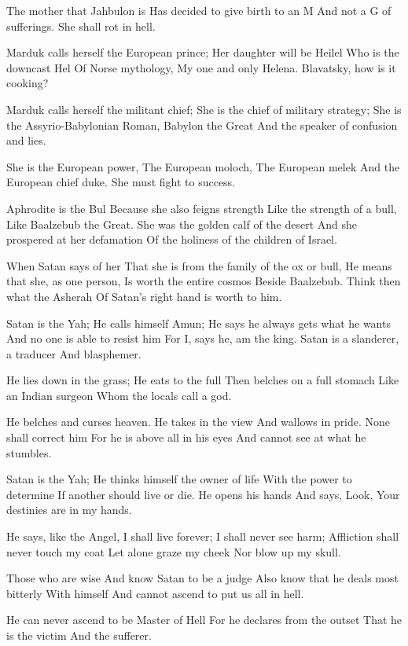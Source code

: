 \documentclass[
]{book}
\begin{document}
The mother that Jahbulon is
Has decided to give birth to an M
And not a G of sufferings.
She shall rot in hell.

Marduk calls herself the European prince;
Her daughter will be Heilel
Who is the downcast Hel
Of Norse mythology,
My one and only Helena.
Blavatsky, how is it cooking?

Marduk calls herself the militant chief;
She is the chief of military strategy;
She is the Assyrio-Babylonian Roman,
Babylon the Great
And the speaker of confusion and lies.

She is the European power,
The European moloch,
The European melek
And the European chief duke.
She must fight to success.

Aphrodite is the Bul
Because she also feigns strength
Like the strength of a bull,
Like Baalzebub the Great.
She was the golden calf of the desert
And she prospered at her defamation
Of the holiness of the children of Israel.

When Satan says of her
That she is from the family of the ox or bull,
He means that she, as one person,
Is worth the entire cosmos
Beside Baalzebub.
Think then what the Asherah
Of Satan's right hand is worth to him.

Satan is the Yah;
He calls himself Amun;
He says he always gets what he wants
And no one is able to resist him
For I, says he, am the king.
Satan is a slanderer, a traducer
And blasphemer.

He lies down in the grass;
He eats to the full
Then belches on a full stomach
Like an Indian surgeon
Whom the locals call a god.

He belches and curses heaven.
He takes in the view
And wallows in pride.
None shall correct him
For he is above all in his eyes
And cannot see at what he stumbles.

Satan is the Yah;
He thinks himself the owner of life
With the power to determine
If another should live or die.
He opens his hands
And says, Look,
Your destinies are in my hands.

He says, like the Angel,
I shall live forever;
I shall never see harm;
Affliction shall never touch my coat
Let alone graze my cheek
Nor blow up my skull.

Those who are wise
And know Satan to be a judge
Also know that he deals most bitterly
With himself
And cannot ascend to put us all in hell.

He can never ascend to be Master of Hell
For he declares from the outset
That he is the victim
And the sufferer.
\end{document}
